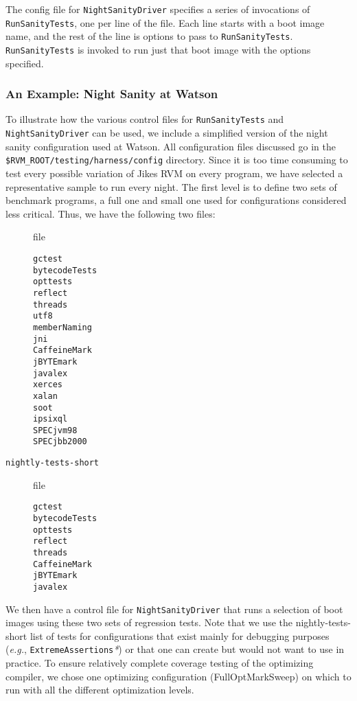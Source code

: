  The config file for {\tt{NightSanityDriver}} specifies a series of
invocations of {\tt{RunSanityTests}}, one per line of the file.  Each
line starts with a boot image name, and the rest of the line is
options to pass to {\tt{RunSanityTests}}.  {\tt{RunSanityTests}} is
invoked to run just that boot image with the options specified.

\subsubsection{An Example: Night Sanity at Watson}

 To illustrate how the various control files for {\tt{RunSanityTests}}
and {\tt{NightSanityDriver}} can be used, we include a simplified
version of the night sanity configuration used at Watson.  All
configuration files discussed go in the
{\tt \$RVM\_\-ROOT/testing/harness/config} directory. Since it is
too time consuming to test every possible variation of Jikes RVM on
every program, we have selected a representative sample to run every
night.  The first level is to define two sets of benchmark programs, a
full one and small one used for configurations considered less
critical.  Thus, we have the following two files:

\begin{description}
\item[] file
\begin{verbatim}
gctest
bytecodeTests
opttests
reflect
threads
utf8
memberNaming
jni
CaffeineMark
jBYTEmark
javalex 
xerces
xalan
soot
ipsixql
SPECjvm98 
SPECjbb2000 
\end{verbatim}
\item[\texttt{nightly-tests-short}] file
\begin{verbatim}
gctest
bytecodeTests
opttests
reflect
threads
CaffeineMark
jBYTEmark
javalex 
\end{verbatim}
\end{description}

 We then have a control file for {\tt{NightSanityDriver}} that runs a
selection of boot images using these two sets of regression tests.
Note that we use the nightly-tests-short list of tests for
configurations that exist mainly for debugging purposes
({\it e.g.}, \texttt{ExtremeAssertions}\textit{*}) or that one can
create but would not want to use in practice.
To ensure relatively complete coverage testing of the optimizing
compiler, we chose one optimizing configuration (FullOptMarkSweep) on
which to run with all the different optimization levels.

